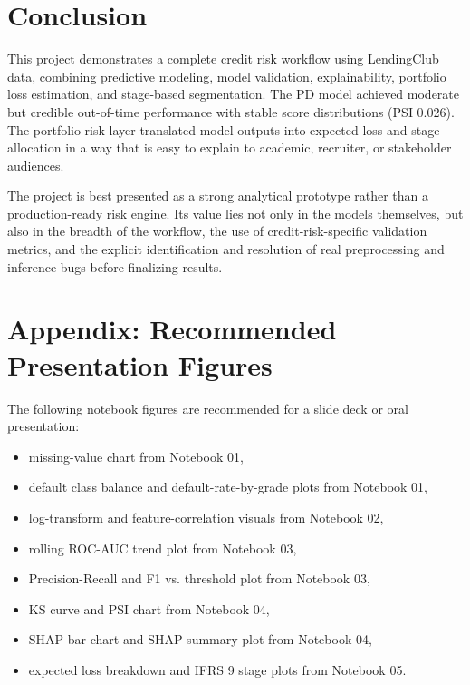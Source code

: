 \documentclass[12pt]{article}
\begin{document}
\section{Conclusion}

This project demonstrates a complete credit risk workflow using LendingClub data, combining predictive modeling, model validation, explainability, portfolio loss estimation, and stage-based segmentation. The PD model achieved moderate but credible out-of-time performance with stable score distributions (PSI 0.026). The portfolio risk layer translated model outputs into expected loss and stage allocation in a way that is easy to explain to academic, recruiter, or stakeholder audiences.

The project is best presented as a strong analytical prototype rather than a production-ready risk engine. Its value lies not only in the models themselves, but also in the breadth of the workflow, the use of credit-risk-specific validation metrics, and the explicit identification and resolution of real preprocessing and inference bugs before finalizing results.

\section*{Appendix: Recommended Presentation Figures}

The following notebook figures are recommended for a slide deck or oral presentation:

\begin{itemize}[leftmargin=1.5em]
    \item missing-value chart from Notebook 01,
    \item default class balance and default-rate-by-grade plots from Notebook 01,
    \item log-transform and feature-correlation visuals from Notebook 02,
    \item rolling ROC-AUC trend plot from Notebook 03,
    \item Precision-Recall and F1 vs. threshold plot from Notebook 03,
    \item KS curve and PSI chart from Notebook 04,
    \item SHAP bar chart and SHAP summary plot from Notebook 04,
    \item expected loss breakdown and IFRS 9 stage plots from Notebook 05.
\end{itemize}
\end{document}
